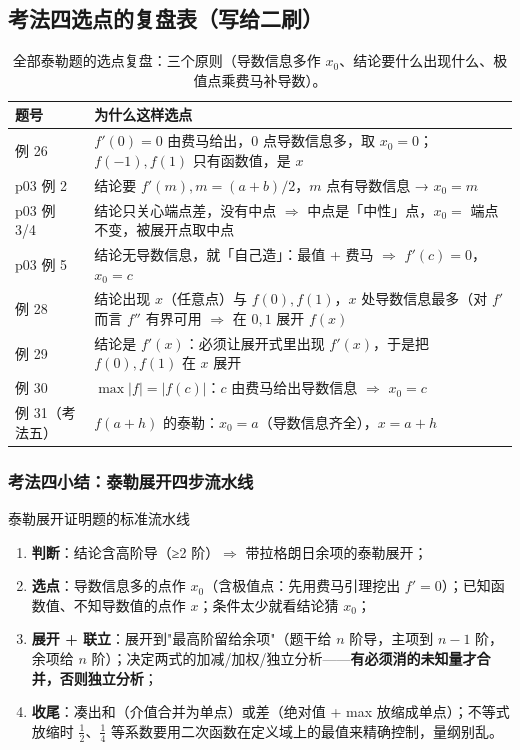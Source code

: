 \documentclass[a4paper]{article}
\begin{document}
\subsection{考法四选点的复盘表（写给二刷）}

\begin{table}[H]
\centering
\small
\begin{tabular}{lp{6.8cm}}
\toprule
\textbf{题号} & \textbf{为什么这样选点} \\
\midrule
例 26 & $f'(0)=0$ 由费马给出，$0$ 点导数信息多，取 $x_0=0$；$f(-1),f(1)$ 只有函数值，是 $x$ \\
p03 例 2 & 结论要 $f'(m),m=(a+b)/2$，$m$ 点有导数信息 → $x_0=m$ \\
p03 例 3/4 & 结论只关心端点差，没有中点 $\Rightarrow$ 中点是「中性」点，$x_0=$ 端点不变，被展开点取中点 \\
p03 例 5 & 结论无导数信息，就「自己造」：最值 + 费马 $\Rightarrow$ $f'(c)=0$，$x_0=c$ \\
例 28 & 结论出现 $x$（任意点）与 $f(0),f(1)$，$x$ 处导数信息最多（对 $f'$ 而言 $f''$ 有界可用 $\Rightarrow$ 在 $0,1$ 展开 $f(x)$ \\
例 29 & 结论是 $f'(x)$：必须让展开式里出现 $f'(x)$，于是把 $f(0),f(1)$ 在 $x$ 展开 \\
例 30 & $\max|f|=|f(c)|$：$c$ 由费马给出导数信息 $\Rightarrow$ $x_0=c$ \\
例 31（考法五） & $f(a+h)$ 的泰勒：$x_0=a$（导数信息齐全），$x=a+h$ \\
\bottomrule
\end{tabular}
\caption{全部泰勒题的选点复盘：三个原则（导数信息多作 $x_0$、结论要什么出现什么、极值点乘费马补导数）。}
\end{table}

\subsubsection{考法四小结：泰勒展开四步流水线}

\begin{importantbox}{泰勒展开证明题的标准流水线}
\begin{enumerate}
\item \textbf{判断}：结论含高阶导（≥2 阶）$\Rightarrow$ 带拉格朗日余项的泰勒展开；
\item \textbf{选点}：导数信息多的点作 $x_0$（含极值点：先用费马引理挖出 $f'=0$）；已知函数值、不知导数值的点作 $x$；条件太少就看结论猜 $x_0$；
\item \textbf{展开 + 联立}：展开到"最高阶留给余项"（题干给 $n$ 阶导，主项到 $n-1$ 阶，余项给 $n$ 阶）；决定两式的加减/加权/独立分析——\textbf{有必须消的未知量才合并，否则独立分析}；
\item \textbf{收尾}：凑出和（介值合并为单点）或差（绝对值 + max 放缩成单点）；不等式放缩时 $\frac12$、$\frac14$ 等系数要用二次函数在定义域上的最值来精确控制，量纲别乱。
\end{enumerate}
\end{importantbox}
\end{document}

